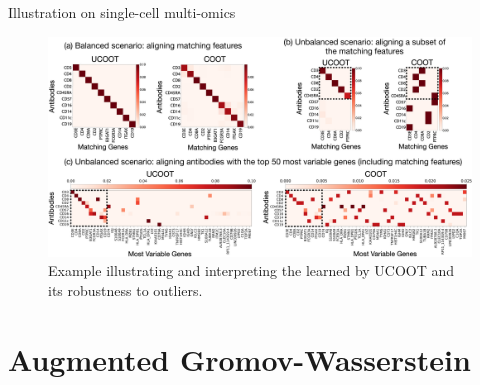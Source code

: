 \documentclass{beamer}
\begin{document}
\begin{frame}{Illustration on single-cell multi-omics}
\scriptsize
\begin{figure}
      \centering
      \includegraphics[width=1.05\linewidth, keepaspectratio=true]{OT_new/genes-alignments.pdf}
      \caption*{\scriptsize{Example illustrating and interpreting the
      {\color{red}{feature alignment $\pi^f$}} learned by UCOOT
      and its robustness to outliers.}}
  \end{figure}
\end{frame}

\section{Augmented Gromov-Wasserstein}
\end{document}
